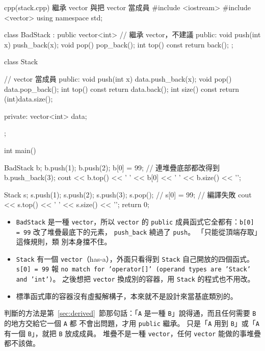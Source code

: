 \begin{example}[label=ex:stack]{cpp}{(stack.cpp) 繼承 vector 與把 vector 當成員}
#include <iostream>
#include <vector>
using namespace std;

class BadStack : public vector<int> {   // 繼承 vector，不建議
public:
    void push(int x) { push_back(x); }
    void pop() { pop_back(); }
    int top() const { return back(); }
};

class Stack {                           // vector 當成員
public:
    void push(int x) { data.push_back(x); }
    void pop() { data.pop_back(); }
    int top() const { return data.back(); }
    int size() const { return (int)data.size(); }

private:
    vector<int> data;
};

int main() {
    BadStack b;
    b.push(1);
    b.push(2);
    b[0] = 99;                  // 連堆疊底部都改得到
    b.push_back(3);
    cout << b.top() << ' ' << b[0] << ' ' << b.size() << '\n';

    Stack s;
    s.push(1);
    s.push(2);
    s.push(3);
    s.pop();
    // s[0] = 99;               // 編譯失敗
    cout << s.top() << ' ' << s.size() << '\n';
    return 0;
}
\end{example}


\begin{itemize}
\item \texttt{BadStack} 是一種 \texttt{vector}，所以 \texttt{vector} 的
\texttt{public} 成員函式它全都有：\texttt{b[0] = 99} 改了堆疊最底下的元素，
\texttt{push\_back} 繞過了 \texttt{push}。 「只能從頂端存取」這條規則，類
別本身擋不住。
\item \texttt{Stack} 有一個 \texttt{vector}（has-a），外面只看得到
\texttt{Stack} 自己開放的四個函式。 \texttt{s[0] = 99} 報 \texttt{no match
for 'operator[]' (operand types are 'Stack' and 'int')}。 之後想把
\texttt{vector} 換成別的容器，用 \texttt{Stack} 的程式也不用改。
\item 標準函式庫的容器沒有虛擬解構子，本來就不是設計來當基底類別的。
\end{itemize}

判斷的方法是第~\ref{sec:derived}~節那句話：「\texttt{A} 是一種
\texttt{B}」說得通，而且任何需要 \texttt{B} 的地方交給它一個 \texttt{A} 都
不會出問題，才用 \texttt{public} 繼承。 只是「\texttt{A} 用到
\texttt{B}」或「\texttt{A} 有一個 \texttt{B}」，就把 \texttt{B} 放成成員。
堆疊不是一種 \texttt{vector}，任何 \texttt{vector} 能做的事堆疊都不該做。

